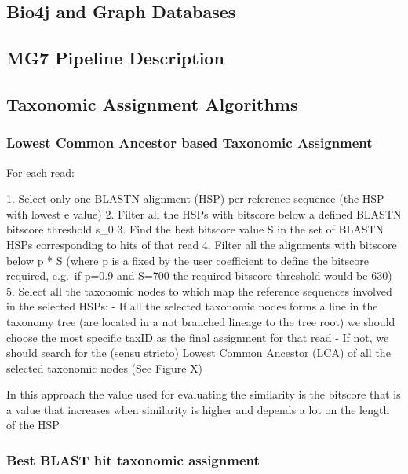 \documentclass{frontiersSCNS} %
\begin{document}
\subsection{Bio4j and Graph Databases}\label{bio4j-and-graph-databases}

\subsection{MG7 Pipeline Description}\label{mg7-pipeline-description}

\subsection{Taxonomic Assignment
Algorithms}\label{taxonomic-assignment-algorithms}

\subsubsection{Lowest Common Ancestor based Taxonomic
Assignment}\label{lowest-common-ancestor-based-taxonomic-assignment}

For each read:

­1. Select only one BLASTN alignment (HSP) per reference sequence (the
HSP with lowest e value) 2. Filter all the HSPs with bitscore below a
defined BLASTN bitscore threshold s\_0 3. Find the best bitscore value S
in the set of BLASTN HSPs corresponding to hits of that read 4. Filter
all the alignments with bitscore below p * S (where p is a fixed by the
user coefficient to define the bitscore required, e.g.~if p=0.9 and
S=700 the required bitscore threshold would be 630) 5. Select all the
taxonomic nodes to which map the reference sequences involved in the
selected HSPs: - If all the selected taxonomic nodes forms a line in the
taxonomy tree (are located in a not branched lineage to the tree root)
we should choose the most specific taxID as the final assignment for
that read - If not, we should search for the (sensu stricto) Lowest
Common Ancestor (LCA) of all the selected taxonomic nodes (See Figure X)

In this approach the value used for evaluating the similarity is the
bitscore that is a value that increases when similarity is higher and
depends a lot on the length of the HSP

\subsubsection{Best BLAST hit taxonomic
assignment}\label{best-blast-hit-taxonomic-assignment}
\end{document}
